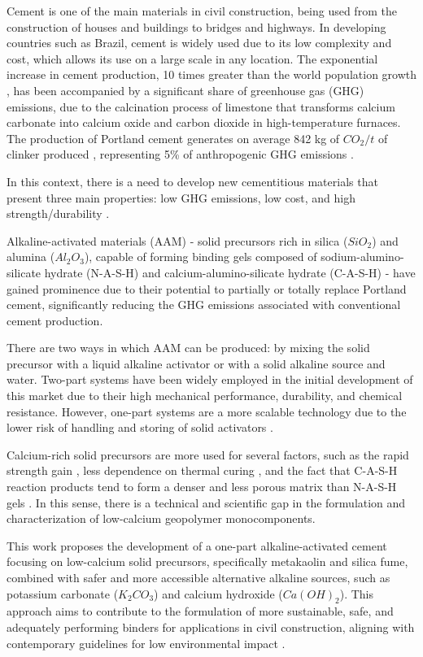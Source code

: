 Cement is one of the main materials in civil construction, being used from the construction of houses and buildings to bridges and highways.
In developing countries such as Brazil, cement is widely used due to its low complexity and cost, which allows its use on a large scale in any location.
The exponential increase in cement production, 10 times greater than the world population growth \cite{united1995world}, has been accompanied by a significant share of greenhouse gas (GHG) emissions, due to the calcination process of limestone that transforms calcium carbonate into calcium oxide and carbon dioxide in high-temperature furnaces.
The production of Portland cement generates on average 842 kg of $CO_2/t$ of clinker produced \cite{andrew2018global}, representing 5\% of anthropogenic GHG emissions \cite{IEA_WBCSD_2009}.

In this context, there is a need to develop new cementitious materials that present three main properties: low GHG emissions, low cost, and high strength/durability \cite{scrivener2018eco}.

Alkaline-activated materials (AAM) - solid precursors rich in silica ($SiO_2$) and alumina ($Al_2O_3$), capable of forming binding gels composed of sodium-alumino-silicate hydrate (N-A-S-H) and calcium-alumino-silicate hydrate (C-A-S-H) - have gained prominence due to their potential to partially or totally replace Portland cement, significantly reducing the GHG emissions associated with conventional cement production.

There are two ways in which AAM can be produced: by mixing the solid precursor with a liquid alkaline activator or with a solid alkaline source and water.
Two-part systems have been widely employed in the initial development of this market due to their high mechanical performance, durability, and chemical resistance.
However, one-part systems are a more scalable technology due to the lower risk of handling and storing of solid activators \cite{provis2018alkali}.

Calcium-rich solid precursors are more used for several factors, such as the rapid strength gain \cite{provis2014geopolymers}, less dependence on thermal curing \cite{ke2021one}, and the fact that C-A-S-H reaction products tend to form a denser and less porous matrix than N-A-S-H gels \cite{bernal2014engineering}.
In this sense, there is a technical and scientific gap in the formulation and characterization of low-calcium geopolymer monocomponents.

This work proposes the development of a one-part alkaline-activated cement focusing on low-calcium solid precursors, specifically metakaolin and silica fume, combined with safer and more accessible alternative alkaline sources, such as potassium carbonate ($K_2CO_3$) and calcium hydroxide ($Ca(OH)_2$).
This approach aims to contribute to the formulation of more sustainable, safe, and adequately performing binders for applications in civil construction, aligning with contemporary guidelines for low environmental impact \cite{PNRS2016}.